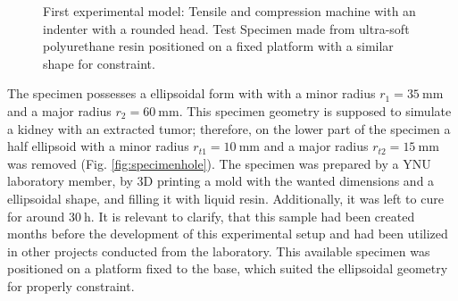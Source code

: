 \begin{figure}%
    \centering
   \qquad
   \caption[Experimental model I]{First experimental model: Tensile and compression machine with an indenter with a rounded head. Test Specimen made from ultra-soft polyurethane resin positioned on a fixed platform with a similar shape for constraint.}%
   \label{fig:firstexperiment}%
\end{figure}

The specimen possesses a ellipsoidal form with 
with a minor radius $r_1 = \SI{35}{\milli \m}$ and a major radius $r_2 = \SI{60}{\milli \m}$. 
This specimen geometry is supposed to simulate a kidney with an extracted tumor; therefore,
on the lower part of the specimen a half ellipsoid with a minor radius $r_{t1} = \SI{10}{\milli \m}$ 
and a major radius $r_{t2} = \SI{15}{\milli \m}$ was removed (Fig. \ref{fig:specimenhole}). 
The specimen was prepared by a YNU laboratory member, by 3D printing a mold with the wanted dimensions
 and a ellipsoidal shape, and filling it with liquid resin. 
 Additionally, it was left to cure for around $\SI{30}{\hour}$. It is relevant to clarify, that this 
 sample had been created months before the development of this experimental setup and 
 had been utilized in other projects conducted from the laboratory.
This available specimen was positioned on a platform fixed to the base, which suited 
the ellipsoidal geometry for properly constraint. 

